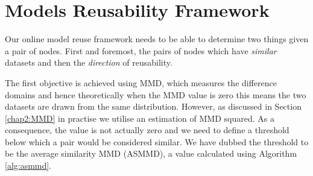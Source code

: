 \documentclass{mpaper}
\begin{document}


\section{Models Reusability Framework}
\label{chap:framework}


Our online model reuse framework needs to be able to determine two things given a pair of nodes. First and foremost, the pairs of nodes which have \textit{similar} datasets and then the \textit{direction} of reusability. 

The first objective is achieved using MMD, which measures the difference domains and hence theoretically when the MMD value is zero this means the two datasets are drawn from the same distribution. However, as discussed in Section \ref{chap2:MMD} in practise we utilise an estimation of MMD squared. As a consequence, the value is not actually zero and we need to define a threshold below which a pair would be considered similar. We have dubbed the threshold to be the average similarity MMD (ASMMD), a value calculated using Algorithm \ref{alg:asmmd}. 

\SetInd{0.1em}{0.5em}
\SetNlSkip{0.3em}
\end{document}
